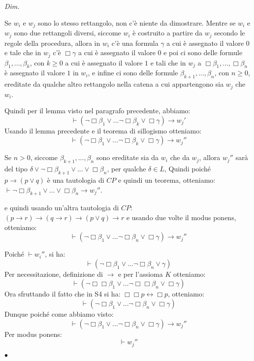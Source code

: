 \documentclass[a4paper, titlepage, 12pt]{report}
\newenvironment{proof}
    {\textit{Dim.}
    }
    {\begin{flushright}$\bullet$\end{flushright}
    }
\begin{document}
\begin{proof}

Se $w_i$ e $w_j$ sono lo stesso rettangolo, non c'è niente da dimostrare.
Mentre se $w_i$ e $w_j$ sono due rettangoli diversi, siccome $w_i$ è costruito
a partire da $w_j$ secondo le regole della procedura, allora in $w_i$ c'è
una formula $\gamma$ a cui è assegnato il valore $0$ e tale che in $w_j$ c'è
$\Box \gamma$ a cui è assegnato il valore $0$ e poi ci sono delle formule
$\beta_1, ..., \beta_k$, con $k \geq 0$ a cui è assegnato il valore $1$ e tali che in $w_j$
a $\Box \beta_1, ..., \Box \beta_n$ è assegnato il valore $1$ in $w_i$,
e infine ci sono delle formule $\beta_{k+1}, ..., \beta_{n}$, con $n \geq 0$,  ereditate da qualche
altro rettangolo nella catena a cui appartengono sia $w_j$ che $w_i$.

Quindi per il lemma visto nel paragrafo precedente, abbiamo:
$$\vdash (\neg \Box \beta_1 \lor ... \neg \Box \beta_k \lor \Box \gamma) \rightarrow w_j'$$
Usando il lemma precedente e il teorema di sillogismo otteniamo:
$$\vdash (\neg \Box \beta_1 \lor ... \neg \Box \beta_k \lor \Box \gamma) \rightarrow w_j''$$

Se $n > 0$, siccome $\beta_{k+1}, ..., \beta_{n}$ sono ereditate sia da $w_i$ che da $w_j$,
allora $w_j''$ sarà del tipo $\delta \lor \neg \Box \beta_{k+1} \lor ... \lor \Box \beta_{n}$, per qualche $\delta \in L$,
Quindi poiché $p \rightarrow (p \lor q)$ è una tautologia di $CP$ e quindi un teorema, otteniamo:
$\vdash \neg \Box \beta_{k+1} \lor ... \lor \Box \beta_{n} \rightarrow w_j''$.

e quindi usando un'altra tautologia di $CP$: $(p \rightarrow r) \rightarrow (q \rightarrow r) \rightarrow (p \lor q) \rightarrow r$
e usando due volte il modus ponens, otteniamo:
$$\vdash (\neg \Box \beta_1 \lor ... \neg \Box \beta_n \lor \Box \gamma) \rightarrow w_j''$$

Poiché $\vdash w_i''$, si ha:
$$\vdash (\neg \Box \beta_1 \lor ... \neg \Box \beta_n \lor \gamma)$$
Per necessitazione, definizione di $\rightarrow$ e per l'assioma $K$ otteniamo:
$$\vdash (\neg \Box \Box \beta_1 \lor ... \neg \Box \Box \beta_n \lor \Box \gamma)$$
Ora sfruttando il fatto che in S4 si ha: $\Box \Box p \leftrightarrow \Box p$, otteniamo:
$$\vdash (\neg \Box \beta_1 \lor ... \neg \Box \beta_n \lor \Box \gamma)$$
Dunque poiché come abbiamo visto:
$$\vdash (\neg \Box \beta_1 \lor ... \neg \Box \beta_n \lor \Box \gamma) \rightarrow w_j''$$
Per modus ponens:
$$\vdash w_j''$$

\end{proof}
\end{document}
